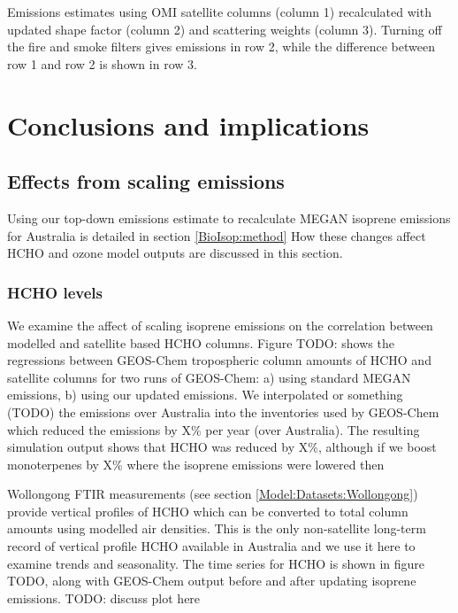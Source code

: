     {Emissions estimates using OMI satellite columns (column 1) recalculated with updated shape factor (column 2) and scattering weights (column 3). Turning off the fire and smoke filters gives emissions in row 2, while the difference between row 1 and row 2 is shown in row 3.}
    {\label{BioIsop:uncertainty:Fire:fig_emiss_without_fire_filter}}
    
    
    
    
\section{Conclusions and implications}
  \label{BioIsop:conclusions}
  
  
  
  \subsection{Effects from scaling emissions}
    \label{BioIsop:conclusions:scaled}
    Using our top-down emissions estimate to recalculate MEGAN isoprene emissions for Australia is detailed in section \ref{BioIsop:method}
    How these changes affect HCHO and ozone model outputs are discussed in this section.
  
    \subsubsection{HCHO levels}
    
      We examine the affect of scaling isoprene emissions on the correlation between modelled and satellite based HCHO columns.
      Figure TODO: shows the regressions between GEOS-Chem tropospheric column amounts of HCHO and satellite columns for two runs of GEOS-Chem: a) using standard MEGAN emissions, b) using our updated emissions.
      We interpolated or something (TODO) the emissions over Australia into the inventories used by GEOS-Chem which reduced the emissions by X\% per year (over Australia).
      The resulting simulation output shows that HCHO was reduced by X\%, although if we boost monoterpenes by X\% where the isoprene emissions were lowered then 
      
      Wollongong FTIR measurements (see section \ref{Model:Datasets:Wollongong}) provide vertical profiles of HCHO which can be converted to total column amounts using modelled air densities.
      This is the only non-satellite long-term record of vertical profile HCHO available in Australia and we use it here to examine trends and seasonality.
      The time series for HCHO is shown in figure TODO, along with GEOS-Chem output before and after updating isoprene emissions.
      TODO: discuss plot here
              
